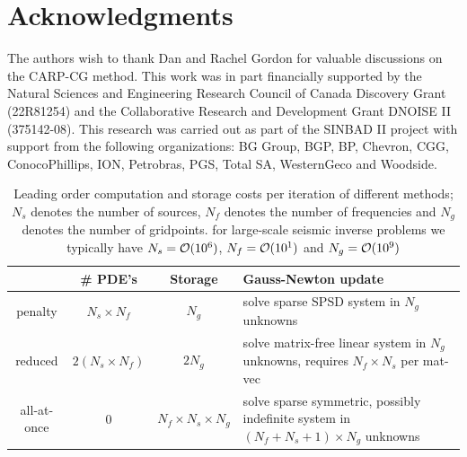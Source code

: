 \documentclass{iopart}
\begin{document}
\section*{Acknowledgments}
The authors wish to thank Dan and Rachel Gordon for valuable discussions
on the CARP-CG method. This work was in part financially supported by
the Natural Sciences and Engineering Research Council of Canada
Discovery Grant (22R81254) and the Collaborative Research and
Development Grant DNOISE II (375142-08). This research was carried out
as part of the SINBAD II project with support from the following
organizations: BG Group, BGP, BP, Chevron, CGG, ConocoPhillips, ION,
Petrobras, PGS, Total SA, WesternGeco and Woodside.


\clearpage

\begin{table}
\begin{tabular}{c|c|c|p{5cm}}
         & \# PDE's & Storage & Gauss-Newton update \\
\hline
penalty  &  $N_s \times N_f $  &    $N_g$     & solve sparse SPSD system  in $N_g$ unknowns \\
\hline
reduced  &  $2(N_s \times N_f) $  &    $2N_g$     & solve matrix-free linear system in $N_g$ unknowns, requires $N_f \times N_s$ per mat-vec                   \\
\hline
all-at-once&   0   &    $N_f \times N_s \times N_g$   &  solve sparse symmetric, possibly indefinite system in $(N_f + N_s + 1) \times N_g$ unknowns \\ 
\end{tabular}
\caption{Leading order computation and storage costs per iteration of different methods; $N_s$ denotes the number of sources, $N_f$ denotes the number of frequencies and $N_g$ denotes the number of gridpoints.
for large-scale seismic inverse problems we typically have $N_s = \mathcal{O}(10^6)$, $N_f = \mathcal{O}(10^1)$ and $N_g = \mathcal{O}(10^9)$}
\label{table:costs}
\end{table}
\clearpage
\end{document}
